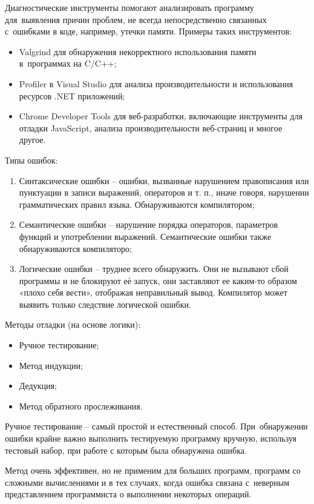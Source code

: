\documentclass{ou}
\begin{document}
Диагностические инструменты помогают анализировать программу для~выявления причин проблем, не всегда непосредственно связанных с~ошибками в коде, например, утечки памяти. Примеры таких инструментов:
\begin{itemize}[label=-, leftmargin=0em, itemindent=3.35em, nosep]
\item Valgrind для обнаружения некорректного использования памяти в~программах на C/C++;
\item Profiler в Visual Studio для анализа производительности и использования ресурсов .NET приложений;
\item Chrome Developer Tools для веб-разработки, включающие инструменты для отладки JavaScript, анализа производительности веб-страниц и многое другое.
\end{itemize}

Типы ошибок:
\begin{enumerate}[leftmargin=0em, itemindent=3.75em, nosep, label=\arabic*)]
\item Синтаксические ошибки -- ошибки, вызванные нарушением правописания или пунктуации в записи выражений, операторов и т. п., иначе говоря, нарушении грамматических правил языка. Обнаруживаются компилятором;
\item Семантические ошибки -- нарушение порядка операторов, параметров функций и употреблении выражений. Семантические ошибки также обнаруживаются компиляторо;
\item Логические ошибки -- труднее всего обнаружить. Они не вызывают сбой программы и не блокируют еѐ запуск, они заставляют ее каким-то образом «плохо себя вести», отображая неправильный вывод. Компилятор может выявить только следствие логической ошибки.
\end{enumerate}

Методы отладки (на основе логики):
\begin{itemize}[label=-, leftmargin=0em, itemindent=3.35em, nosep]
\item Ручное тестирование;
\item Метод индукции;
\item Дедукция;
\item Метод обратного прослеживания.
\end{itemize}

Ручное тестирование -- самый простой и естественный способ. При~обнаружении ошибки крайне важно выполнить тестируемую программу вручную, используя тестовый набор, при работе с которым была обнаружена ошибка.
 
Метод очень эффективен, но не применим для больших программ, программ со сложными вычислениями и в тех случаях, когда ошибка связана с~неверным представлением программиста о выполнении некоторых операций.
 
\end{document}
